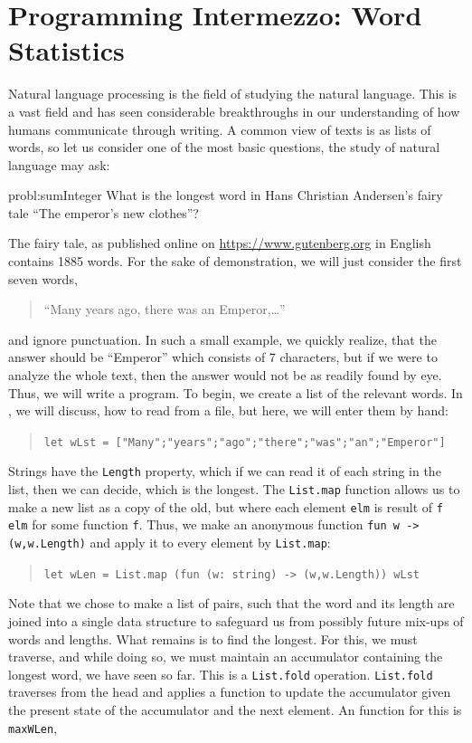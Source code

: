 \documentclass[fsharpNotes.tex]{subfiles}
\begin{document}
\section{Programming Intermezzo: Word Statistics}
Natural language processing is the field of studying the natural language. This is a vast field and has seen considerable breakthroughs in our understanding of how humans communicate through writing. A common view of texts is as lists of words, so let us consider one of the most basic questions, the study of natural language may ask:
%
\begin{task}{probl:sumInteger}
  What is the longest word in Hans Christian Andersen's fairy tale ``The emperor's new clothes''?
\end{task}
%
The fairy tale, as published online on \url{https://www.gutenberg.org} in English contains 1885 words. For the sake of demonstration, we will just consider the first seven words,
\begin{quote}
  ``Many years ago, there was an Emperor,\dots''
\end{quote}
and ignore punctuation. In such a small example, we quickly realize, that the answer should be ``Emperor'' which consists of 7 characters, but if we were to analyze the whole text, then the answer would not be as readily found by eye. Thus, we will write a program. To begin, we create a list of the relevant words. In , we will discuss, how to read from a file, but here, we will enter them by hand:
\begin{quote}
  \lstinline{let wLst = ["Many";"years";"ago";"there";"was";"an";"Emperor"]}
\end{quote}
Strings have the \lstinline{Length} property, which if we can read it of each string in the list, then we can decide, which is the longest. The \lstinline{List.map} function allows us to make a new list as a copy of the old, but where each element \lstinline{elm} is result of \lstinline{f elm} for some function \lstinline{f}. Thus, we make an anonymous function \lstinline{fun w -> (w,w.Length)} and apply it to every element by \lstinline{List.map}:
\begin{quote}
  \lstinline{let wLen = List.map (fun (w: string) -> (w,w.Length)) wLst}
\end{quote}
Note that we chose to make a list of pairs, such that the word and its length are joined into a single data structure to safeguard us from possibly future mix-ups of words and lengths. What remains is to find the longest. For this, we must traverse, and while doing so, we must maintain an accumulator containing the longest word, we have seen so far. This is a \lstinline{List.fold} operation. \lstinline{List.fold} traverses from the head and applies a function to update the accumulator given the present state of the accumulator and the next element. An function for this is \lstinline{maxWLen},
\end{document}
